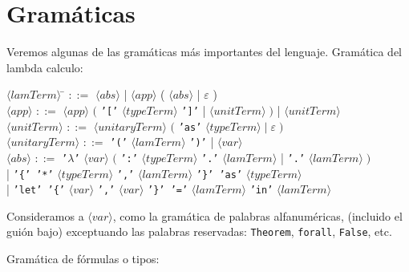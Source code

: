 \documentclass[a4paper,11pt]{article}
\theoremstyle{definition}
\theoremstyle{remark}
\begin{document}
\section{Gramáticas}
\label{gramáticas}
Veremos algunas de las gramáticas más importantes del lenguaje.
Gramática del lambda calculo:

\begin{tabbing}
$\langle lamTerm \rangle$ \hspace{0.5cm} \= $::=$ $\langle abs \rangle$ | $\langle app \rangle$ 
\Big( $\langle abs \rangle$ | $\varepsilon$ \Big) \\

$\langle app \rangle$ \> $::=$ $\langle app \rangle$ $\Big($ \texttt{'['} $\langle typeTerm \rangle$ \texttt{']'} 
| $\langle unitTerm \rangle \; \Big)$ 
| $\langle unitTerm \rangle$ \\

$\langle unitTerm \rangle$ \> $::=$ $\langle unitaryTerm \rangle$ $\Big($ \texttt{'as'} $\langle typeTerm \rangle \; 
| \; \varepsilon \; \Big)$ \\

$\langle unitaryTerm \rangle$ \> $::=$ \texttt{'('} $\langle lamTerm \rangle$ \texttt{')'} 
| $\langle var \rangle$ \\

$\langle abs \rangle$ \> $::=$ \texttt{'$\lambda$'} $\langle var \rangle$ $\Big($ \texttt{':'} $\langle typeTerm \rangle$ \texttt{'.'} 
$\langle lamTerm \rangle$ | \texttt{'.'} $\langle lamTerm \rangle \; \Big)$ \\
\> | \texttt{'\{' '*'} $\langle typeTerm \rangle$ \texttt{','} $\langle lamTerm \rangle$ \texttt{'\}' 'as'} $\langle typeTerm \rangle$ \\
\> | \texttt{'let' '\{'} $\langle var \rangle$ \texttt{','} $\langle var \rangle$ \texttt{'\}' '='} $\langle lamTerm \rangle$ \texttt{'in'}
$\langle lamTerm \rangle$

\end{tabbing}

Consideramos a $\langle var \rangle$, como la gramática de palabras alfanuméricas, (incluido el guión bajo) 
exceptuando las palabras reservadas: \texttt{Theorem}, \texttt{forall}, \texttt{False}, etc.

Gramática de fórmulas o tipos:
\end{document}
